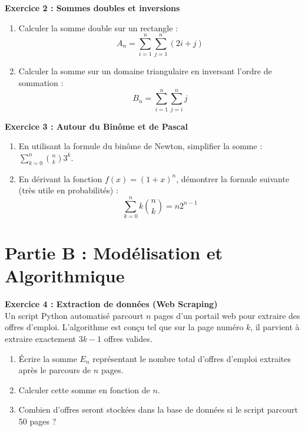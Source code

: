 \textbf{Exercice 2 : Sommes doubles et inversions}
\begin{enumerate}
    \item Calculer la somme double sur un rectangle :
    $$ A_n = \sum_{i=1}^{n} \sum_{j=1}^{n} (2i + j) $$
    \item Calculer la somme sur un domaine triangulaire en inversant l'ordre de sommation :
    $$ B_n = \sum_{i=1}^{n} \sum_{j=i}^{n} j $$
\end{enumerate}

\textbf{Exercice 3 : Autour du Binôme et de Pascal}
\begin{enumerate}
    \item En utilisant la formule du binôme de Newton, simplifier la somme : $ \sum_{k=0}^{n} \binom{n}{k} 3^k $.
    \item En dérivant la fonction $f(x) = (1+x)^n$, démontrer la formule suivante (très utile en probabilités) :
    $$ \sum_{k=0}^{n} k \binom{n}{k} = n 2^{n-1} $$
\end{enumerate}

\vspace{1cm}

\section*{Partie B : Modélisation et Algorithmique}

\textbf{Exercice 4 : Extraction de données (Web Scraping)} \\
Un script Python automatisé parcourt $n$ pages d'un portail web pour extraire des offres d'emploi. L'algorithme est conçu tel que sur la page numéro $k$, il parvient à extraire exactement $3k - 1$ offres valides.
\begin{enumerate}
    \item Écrire la somme $E_n$ représentant le nombre total d'offres d'emploi extraites après le parcours de $n$ pages.
    \item Calculer cette somme en fonction de $n$.
    \item Combien d'offres seront stockées dans la base de données si le script parcourt 50 pages ?
\end{enumerate}

